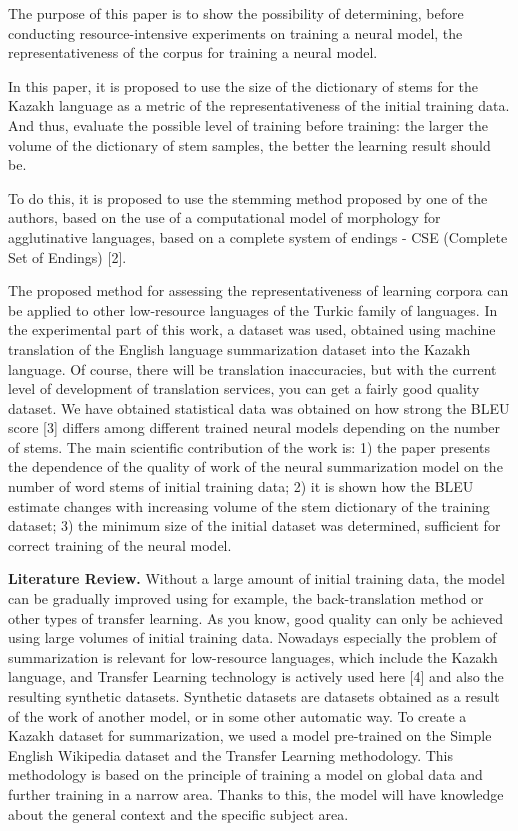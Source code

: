 The purpose of this paper is to show the possibility of determining,
before conducting resource-intensive experiments on training a neural
model, the representativeness of the corpus for training a neural model.

In this paper, it is proposed to use the size of the dictionary of stems
for the Kazakh language as a metric of the representativeness of the
initial training data. And thus, evaluate the possible level of training
before training: the larger the volume of the dictionary of stem
samples, the better the learning result should be.

To do this, it is proposed to use the stemming method proposed by one of
the authors, based on the use of a computational model of morphology for
agglutinative languages, based on a complete system of endings - CSE
(Complete Set of Endings) {[}2{]}.

The proposed method for assessing the representativeness of learning
corpora can be applied to other low-resource languages
\hspace{0pt}\hspace{0pt}of the Turkic family of languages. In the
experimental part of this work, a dataset was used, obtained using
machine translation of the English language summarization dataset into
the Kazakh language. Of course, there will be translation inaccuracies,
but with the current level of development of translation services, you
can get a fairly good quality dataset. We have obtained statistical data
was obtained on how strong the BLEU score {[}3{]} differs among
different trained neural models depending on the number of stems. The
main scientific contribution of the work is: 1) the paper presents the
dependence of the quality of work of the neural summarization model on
the number of word stems of initial training data; 2) it is shown how
the BLEU estimate changes with increasing volume of the stem dictionary
of the training dataset; 3) the minimum size of the initial dataset was
determined, sufficient for correct training of the neural model.

\textbf{Literature Review.} Without a large amount of initial training
data, the model can be gradually improved using for example, the
back-translation method or other types of transfer learning. As you
know, good quality can only be achieved using large volumes of initial
training data. Nowadays especially the problem of summarization is
relevant for low-resource languages, which include the Kazakh language,
and Transfer Learning technology is actively used here {[}4{]} and also
the resulting synthetic datasets. Synthetic datasets are datasets
obtained as a result of the work of another model, or in some other
automatic way. To create a Kazakh dataset for summarization, we used a
model pre-trained on the Simple English Wikipedia dataset and the
Transfer Learning methodology. This methodology is based on the
principle of training a model on global data and further training in a
narrow area. Thanks to this, the model will have knowledge about the
general context and the specific subject area.

